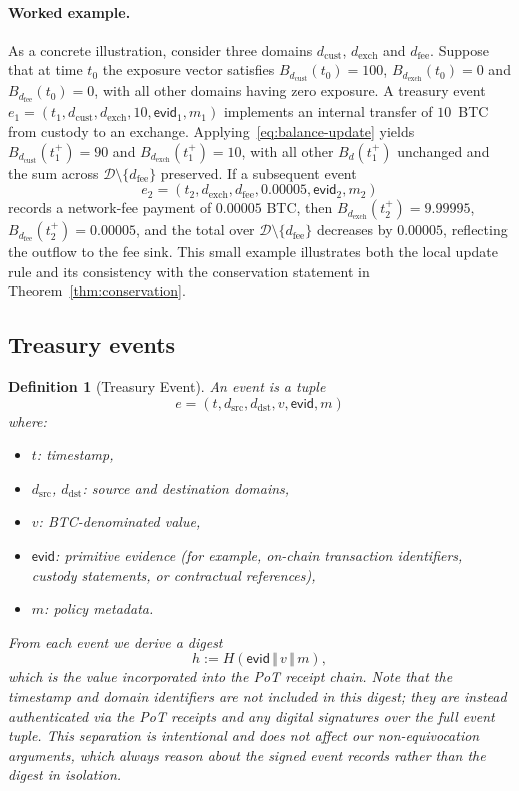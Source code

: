 \documentclass[11pt]{article}
\newtheorem{definition}{Definition}
\begin{document}
\paragraph{Worked example.}
As a concrete illustration, consider three domains $d_{\mathrm{cust}}$, $d_{\mathrm{exch}}$ and $d_{\mathrm{fee}}$.
Suppose that at time $t_0$ the exposure vector satisfies
$B_{d_{\mathrm{cust}}}(t_0)=100$, $B_{d_{\mathrm{exch}}}(t_0)=0$ and $B_{d_{\mathrm{fee}}}(t_0)=0$, with all other domains having zero exposure.
A treasury event
$e_1=(t_1,d_{\mathrm{cust}},d_{\mathrm{exch}},10,\mathsf{evid}_1,m_1)$
implements an internal transfer of $10$~BTC from custody to an exchange.
Applying~\eqref{eq:balance-update} yields
$B_{d_{\mathrm{cust}}}(t_1^+)=90$ and $B_{d_{\mathrm{exch}}}(t_1^+)=10$, with all other $B_d(t_1^+)$ unchanged and the sum across $\mathcal{D} \setminus \{d_{\mathrm{fee}}\}$ preserved.
If a subsequent event
\[
e_2=(t_2, d_{\mathrm{exch}}, d_{\mathrm{fee}}, 0.00005, \mathsf{evid}_2, m_2)
\]
records a network-fee payment of $0.00005$ BTC, then
$B_{d_{\mathrm{exch}}}(t_2^+) = 9.99995$,
$B_{d_{\mathrm{fee}}}(t_2^+) = 0.00005$,
and the total over $\mathcal{D} \setminus \{d_{\mathrm{fee}}\}$ decreases by $0.00005$, reflecting the outflow to the fee sink.
This small example illustrates both the local update rule and its consistency with the conservation statement in Theorem~\ref{thm:conservation}.

\subsection{Treasury events}

\begin{definition}[Treasury Event]
An event is a tuple
\[
e = (t, d_{\mathrm{src}}, d_{\mathrm{dst}}, v, \mathsf{evid}, m)
\]
where:
\begin{itemize}[noitemsep]
\item $t$: timestamp,
\item $d_{\mathrm{src}}$, $d_{\mathrm{dst}}$: source and destination domains,
\item $v$: BTC-denominated value,
\item $\mathsf{evid}$: primitive evidence (for example, on-chain transaction identifiers, custody statements, or contractual references),
\item $m$: policy metadata.
\end{itemize}
From each event we derive a digest
\[
h := H(\mathsf{evid} \,\Vert\, v \,\Vert\, m),
\]
which is the value incorporated into the PoT receipt chain.
Note that the timestamp and domain identifiers are not included in this digest; they are instead authenticated via the PoT receipts and any digital signatures over the full event tuple.
This separation is intentional and does not affect our non-equivocation arguments, which always reason about the signed event records rather than the digest in isolation.
\end{definition}
\end{document}
